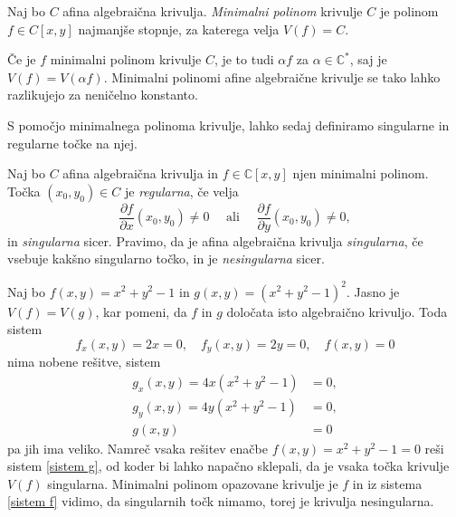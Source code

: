 \documentclass[mat1]{fmfdelo}
\numberwithin{equation}{section}
\newcommand{\C}{\mathbb C}
\newcommand{\CM}{\mathbb C ^*}
\theoremstyle{definition}
\begin{document}
\begin{definicija}
    Naj bo $C$ afina algebraična krivulja. \emph{Minimalni polinom} krivulje $C$ je polinom $f \in C[x,y]$ najmanjše stopnje, za katerega velja $V(f) = C$.
\end{definicija}

\begin{opomba}
    Če je $f$ minimalni polinom krivulje $C$, je to tudi $\alpha f$ za $\alpha \in \CM$, saj je $V(f) = V(\alpha f)$. Minimalni polinomi afine algebraične krivulje se tako lahko razlikujejo za neničelno konstanto.
\end{opomba}

S pomočjo minimalnega polinoma krivulje, lahko sedaj definiramo singularne in regularne točke na njej.

\begin{definicija}
    \label{reg sing tocke}
    Naj bo $C$ afina algebraična krivulja in $f \in \C[x,y]$ njen minimalni polinom. Točka $(x_0, y_0) \in C$ je \emph{regularna}, če velja
    \[
        \frac{\partial f}{\partial x}(x_0, y_0) \neq 0 \quad \text{ ali } \quad \frac{\partial f}{\partial y}(x_0, y_0) \neq 0,
    \] 
    in \emph{singularna} sicer. Pravimo, da je afina algebraična krivulja \emph{singularna}, če vsebuje kakšno singularno točko, in je \emph{nesingularna} sicer.
\end{definicija}

\begin{primer*}
    Naj bo $f(x,y) = x^2 + y^2 - 1$ in $g(x,y) = (x^2 + y^2 - 1)^2$. Jasno je $V(f) = V(g)$, kar pomeni, da $f$ in $g$ določata isto algebraično krivuljo. Toda sistem 
    \begin{equation}
        \label{sistem f}
        f_x(x,y) = 2x = 0, \quad f_y(x,y) = 2y = 0, \quad f(x,y) = 0
    \end{equation}
    nima nobene rešitve, sistem
    \begin{align}
        \label{sistem g}
        g_x(x,y) = 4x(x^2 + y^2 - 1) &= 0, \nonumber \\ 
        g_y(x,y) = 4y(x^2 + y^2 - 1) &= 0, \\
        g(x,y) &= 0 \nonumber
    \end{align}
    pa jih ima veliko. Namreč vsaka rešitev enačbe $f(x,y) = x^2 + y^2 - 1 = 0$ reši sistem \ref{sistem g}, od koder bi lahko napačno sklepali, da je vsaka točka krivulje $V(f)$ singularna. Minimalni polinom opazovane krivulje je $f$ in iz sistema \ref{sistem f} vidimo, da singularnih točk nimamo, torej je krivulja nesingularna. 
    
\end{primer*}
\end{document}
